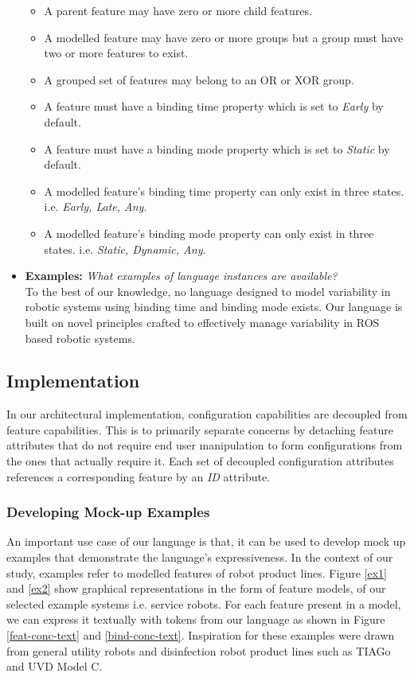 \documentclass[conference]{IEEEtran}
\begin{document}
\begin{itemize}
\begin{itemize}
            \item A parent feature may have zero or more child features.
            \item A modelled feature may have zero or more groups but a group must have two or more features to exist.
            \item A grouped set of features may belong to an OR or XOR group.
            \item A feature must have a binding time property which is set to \textit{Early} by default.
            \item A feature must have a binding mode property which is set to \textit{Static} by default.
            \item A modelled feature's binding time property can only exist in three states. i.e. \textit{Early, Late, Any}.
            \item A modelled feature's binding mode property can only exist in three states. i.e. \textit{Static, Dynamic, Any}.
        \end{itemize}
        \item \textbf{Examples: }\textit{What examples of language instances are available?}\\
        To the best of our knowledge, no language designed to model variability in robotic systems using binding time and binding mode exists. Our language is built on novel principles crafted to effectively manage variability in ROS based robotic systems.
    \end{itemize}
    
\subsection{Implementation}
In our architectural implementation, configuration capabilities are decoupled from feature capabilities. This is to primarily separate concerns by detaching feature attributes that do not require end user manipulation to form configurations from the ones that actually require it. Each set of decoupled configuration attributes references a corresponding feature by an \textit{ID} attribute.

\subsubsection{Developing Mock-up Examples}
An important use case of our language is that, it can be used to develop mock up examples that demonstrate the language's expressiveness. In the context of our study, examples refer to modelled features of robot product lines. Figure \ref{ex1} and \ref{ex2} show graphical representations in the form of feature models, of our selected example systems i.e. service robots. For each feature present in a model, we can express it textually with tokens from our language as shown in Figure \ref{feat-conc-text} and \ref{bind-conc-text}. Inspiration for these examples were drawn from general utility robots and disinfection robot product lines such as TIAGo and UVD Model C.
    
\end{document}
